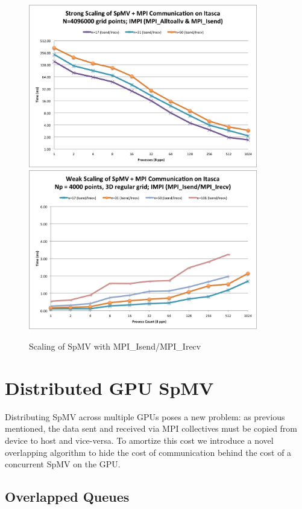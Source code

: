 \documentclass{report}
\begin{document}
\begin{figure}
\centering
\includegraphics[width=10cm]{performance_content/scaling/strong_scaling_4M_regular_isend.png}  
\includegraphics[width=10cm]{performance_content/scaling/weak_scaling_np4000_regular_isend.png}  
\caption{Scaling of SpMV with MPI\_Isend/MPI\_Irecv}
\end{figure}


\chapter{Distributed GPU SpMV}
\label{chap:multigpu_rbffd}

Distributing SpMV across multiple GPUs poses a new problem: as previous mentioned, the data sent and received via MPI collectives must be copied from device to host and vice-versa. To amortize this cost we introduce a novel overlapping algorithm to hide the cost of communication behind the cost of a concurrent SpMV on the GPU. 

\section{Overlapped Queues}
\end{document}

